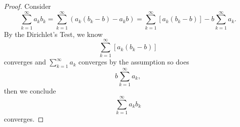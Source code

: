 \begin{Exercise}
\begin{proof}
Consider $$\sum_{k=1}^{\infty}a_k b_k =
\sum_{k=1}^{\infty}\left( a_k(b_k-b) - a_k b\right) = 
\sum_{k=1}^{\infty}\left[ a_k(b_k-b) \right] - b\sum_{k=1}^{\infty}a_k.$$
By the Dirichlet's Test, we know $$\sum_{k=1}^{\infty}\left[ a_k(b_k-b) \right]$$ converges and $\sum_{k=1}^{\infty}a_k$ converges by the assumption so does $$b\sum_{k=1}^{\infty}a_k,$$ then we conclude $$\sum_{k=1}^{\infty}a_k b_k$$ converges.
\end{proof}
\end{Exercise}